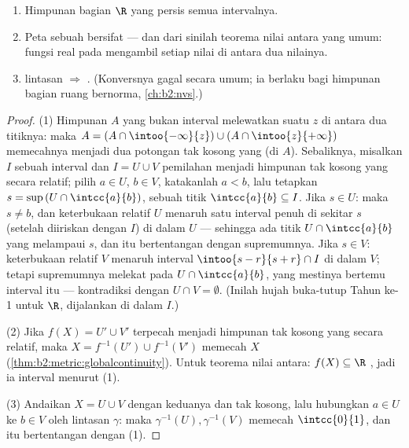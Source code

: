 \begin{theorem}\label{thm:b2:metric:connectedness}
\begin{enumerate}
  \item Himpunan bagian $\R$ yang  persis semua intervalnya.
  \item Peta  sebuah  bersifat  ---
        dan dari sinilah teorema nilai antara yang umum: fungsi real
         pada  mengambil setiap nilai di antara
        dua nilainya.
  \item {} lintasan $\Rightarrow$ . (Konversnya gagal
        secara umum; ia berlaku bagi himpunan bagian  ruang
        bernorma, \cref{ch:b2:nvs}.)
\end{enumerate}
\end{theorem}

\begin{proof}
(1) Himpunan $A$ yang bukan interval melewatkan suatu $z$ di antara dua
titiknya: maka $A = (A \cap \intoo{-\infty}{z}) \cup (A \cap
\intoo{z}{+\infty})$ memecahnya menjadi dua potongan tak kosong yang
 (di $A$). Sebaliknya, misalkan $I$ sebuah interval dan $I = U
\cup V$ pemilahan menjadi himpunan tak kosong yang  secara relatif;
pilih $a \in U$, $b \in V$, katakanlah $a < b$, lalu tetapkan
$s = \sup\,(U \cap \intcc{a}{b})$, sebuah titik $\intcc{a}{b}
\subseteq I$. Jika $s \in U$: maka $s \neq b$, dan keterbukaan relatif
$U$ menaruh satu interval penuh di sekitar $s$ (setelah diiriskan dengan
$I$) di dalam $U$ --- sehingga ada titik $U \cap \intcc{a}{b}$ yang
melampaui $s$, dan itu bertentangan dengan supremumnya. Jika $s \in V$:
keterbukaan relatif $V$ menaruh interval $\intoo{s - r}{s + r} \cap I$ di
dalam $V$; tetapi supremumnya melekat pada $U \cap \intcc{a}{b}$, yang
mestinya bertemu interval itu --- kontradiksi dengan $U \cap V =
\emptyset$. (Inilah hujah buka-tutup Tahun ke-1 untuk $\R$, dijalankan di dalam $I$.)

(2) Jika $f(X) = U' \cup V'$ terpecah menjadi himpunan tak kosong yang
 secara relatif, maka $X = f^{-1}(U') \cup f^{-1}(V')$ memecah $X$
(\cref{thm:b2:metric:globalcontinuity}). Untuk teorema nilai antara:
$f(X) \subseteq \R$ , jadi ia interval menurut (1).

(3) Andaikan $X = U \cup V$ dengan keduanya  dan tak kosong, lalu
hubungkan $a \in U$ ke $b \in V$ oleh lintasan $\gamma$: maka
$\gamma^{-1}(U), \gamma^{-1}(V)$ memecah $\intcc{0}{1}$, dan itu
bertentangan dengan (1).
\end{proof}

